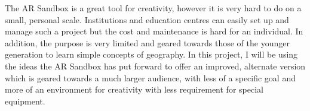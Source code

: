 \documentclass[11pt]{article}
\begin{document}
The AR Sandbox is a great tool for creativity, however it is very hard to do
on a small, personal scale. Institutions and education centres can easily set
up and manage such a project but the cost and maintenance is hard for an
individual. In addition, the purpose is very limited and geared towards those
of the younger generation to learn simple concepts of geography. In this project,
I will be using the ideas the AR Sandbox has put forward to offer an
improved, alternate version which is geared towards a much larger audience, with
less of a specific goal and more of an environment for creativity with less
requirement for special equipment.

\end{document}
